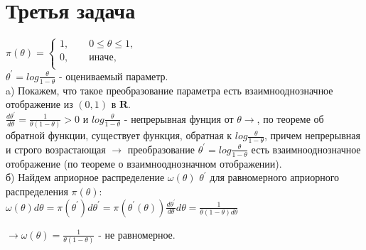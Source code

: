 \documentclass{article}
\begin{document}
\section{Третья задача}
$
\pi(\theta)=
\begin{cases}
1, \qquad 0 \leq \theta \leq 1, \\
0, \qquad иначе , \\
\end{cases}
$\\
$\theta^{'} = log\frac{\theta}{1-\theta}$ - оцениваемый параметр.\\
a) Покажем, что такое преобразование параметра есть взаимнооднозначное отображение из $(0,1)$ в $\mathbf{R}$.\\
$\frac{d\theta^{'}}{d\theta} = \frac{1}{\theta(1-\theta)} > 0$ и $log\frac{\theta}{1-\theta}$ - непрерывная фунция от $\theta \to$, по теореме об обратной функции, существует функция, обратная к $log\frac{\theta}{1-\theta}$, причем непрерывная и строго возрастающая $\to$ преобразование $\theta^{'} = log\frac{\theta}{1-\theta}$ есть взаимнооднозначное отображение (по теореме о взаимнооднозначном отображении).\\
б) Найдем априорное распределение $\omega(\theta)$ $\theta^{'}$ для равномерного априорного распределения $\pi(\theta)$:\\
$\omega(\theta)d\theta = \pi(\theta^{'})d\theta^{'} = \pi(\theta^{'}(\theta))\frac{d\theta^{'}}{d\theta}d\theta = \frac{1}{\theta(1-\theta)d\theta}$
\begin{center}
$\to \omega(\theta) = \frac{1}{\theta(1-\theta)}$ - не равномерное.
\end{center}
\end{document}
